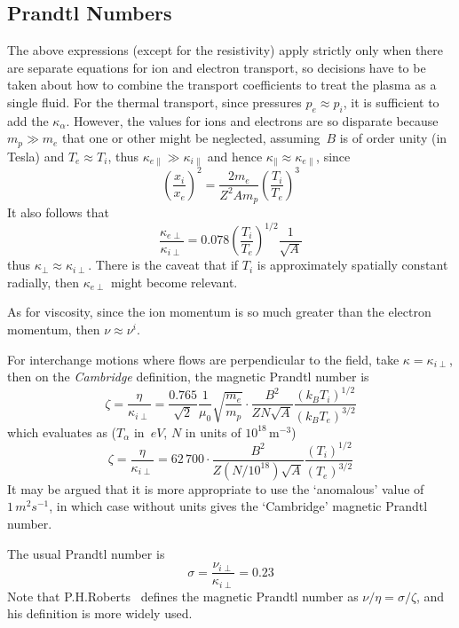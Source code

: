 \subsection{Prandtl Numbers}\label{sec:prandtl}
The above expressions (except for the resistivity) apply strictly only when there
are separate equations for ion and electron transport, 
so decisions have to be taken about how to combine the transport coefficients
to treat the plasma as a single fluid. For the thermal transport, since 
pressures $p_e\approx p_i$, it is sufficient to add the $\kappa_\alpha$. However, the values for ions and electrons
are so disparate because $m_p\gg m_e$ that one or other might be neglected, 
assuming~$B$ is of order unity (in Tesla) and $T_e\approx T_i$, 
thus $\kappa_{e\|} \gg \kappa_{i\|}$ and hence 
$\kappa_{\|}\approx \kappa_{e\|}$, since 
\begin{equation}\label{eq:rbrat}
\left(\frac{x_i}{x_e}\right)^2 = \frac{2m_e}{Z^2 A m_p} \left(\frac{T_i}{T_e}\right)^3
\end{equation}
It also follows that
\begin{equation}\label{eq:krat}
\frac{\kappa_{e\perp}}{\kappa_{i\perp}} = 0.078 \left(\frac{T_i}{T_e}\right)^{1/2}
\frac{1}{\sqrt{A}}
\end{equation}
thus $\kappa_{\perp}\approx \kappa_{i\perp}$.
There is the caveat that if $T_i$ is approximately spatially constant radially,
then $\kappa_{e\perp}$ might become relevant.

As for viscosity, since the ion momentum is so much greater than the electron momentum, then $\nu\approx\nu^i$.

For interchange motions where flows are perpendicular to the field, take 
$\kappa=\kappa_{i\perp}$, then on the \emph{Cambridge} definition, the magnetic Prandtl number is
\begin{equation}\label{eq:zeta}
\zeta=\frac{\eta}{\kappa_{i\perp}}=\frac{0.765}{\sqrt{2}}\frac{1}{\mu_0}\sqrt{\frac{m_e}{m_p}} \cdot
\frac{B^2}{Z N\sqrt{A}} \frac{(k_BT_i)^{1/2}}{(k_BT_e)^{3/2}}
\end{equation}
which evaluates as ($T_\alpha$ in~$eV$, $N$ in units of $10^{18}$\,m$^{-3}$)
\begin{equation}\label{eq:zetan}
\zeta=\frac{\eta}{\kappa_{i\perp}}=62\,700 \cdot \frac{B^2}{Z (N/10^{18})\sqrt{A}} \frac{(T_i)^{1/2}}{(T_e)^{3/2}}
\end{equation}
It may be argued that it is more appropriate to use the `anomalous'  value of $1\,m^2 s^{-1}$,
in which case  without units gives the `Cambridge'  magnetic Prandtl number.

The usual Prandtl number is
\begin{equation}\label{eq:sigma}
\sigma=\frac{\nu_{i\perp}}{\kappa_{i\perp}}=0.23
\end{equation}
Note that P.H.Roberts~\cite{roberts} defines the magnetic Prandtl number
as $\nu/\eta=\sigma/\zeta$, and his definition is more widely used.

